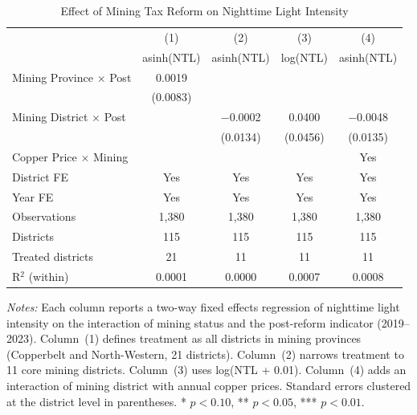 \begin{table}[htbp]
\centering
\caption{Effect of Mining Tax Reform on Nighttime Light Intensity}
\label{tab:main}
\begin{tabular}{lcccc}
\hline\hline
 & (1) & (2) & (3) & (4) \\
 & asinh(NTL) & asinh(NTL) & log(NTL) & asinh(NTL) \\
\hline
\addlinespace
Mining Province $\times$ Post & 0.0019 & & & \\
 & (0.0083) & & & \\
\addlinespace
Mining District $\times$ Post & & $-$0.0002 & 0.0400 & $-$0.0048 \\
 & & (0.0134) & (0.0456) & (0.0135) \\
\addlinespace
Copper Price $\times$ Mining & & & & Yes \\
District FE & Yes & Yes & Yes & Yes \\
Year FE & Yes & Yes & Yes & Yes \\
\addlinespace
Observations & 1,380 & 1,380 & 1,380 & 1,380 \\
Districts & 115 & 115 & 115 & 115 \\
Treated districts & 21 & 11 & 11 & 11 \\
R$^2$ (within) & 0.0001 & 0.0000 & 0.0007 & 0.0008 \\
\hline\hline
\end{tabular}
\begin{tablenotes}
\item \textit{Notes:} Each column reports a two-way fixed effects regression of nighttime light intensity on the interaction of mining status and the post-reform indicator (2019--2023). Column~(1) defines treatment as all districts in mining provinces (Copperbelt and North-Western, 21 districts). Column~(2) narrows treatment to 11 core mining districts. Column~(3) uses log(NTL + 0.01). Column~(4) adds an interaction of mining district with annual copper prices. Standard errors clustered at the district level in parentheses. * $p<0.10$, ** $p<0.05$, *** $p<0.01$.
\end{tablenotes}
\end{table}
